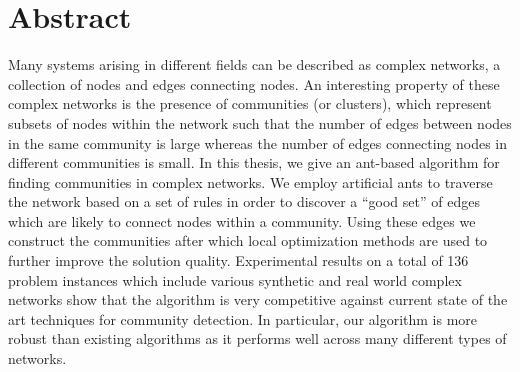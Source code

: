\chapter*{Abstract}
\begin{spacing}{1.5}
Many systems arising in different fields can be described as complex networks, a collection of nodes and edges connecting nodes. An interesting property of these complex networks is the presence of communities (or clusters), which represent subsets of nodes within the network such that the number of edges between nodes in the same community is large whereas the number of edges connecting nodes in different communities is small. In this thesis, we give an ant-based algorithm for finding communities in complex networks. We employ artificial ants to traverse the network based on a set of rules in order to discover a ``good set'' of edges which are likely to connect nodes within a community. Using these edges we construct the communities after which local optimization methods are used to further improve the solution quality. Experimental results on a total of 136 problem instances which include various synthetic and real world complex networks show that the algorithm is very competitive against current state of the art techniques for community detection. In particular, our algorithm is more robust than existing algorithms as it performs well across many different types of networks.
\end{spacing}
